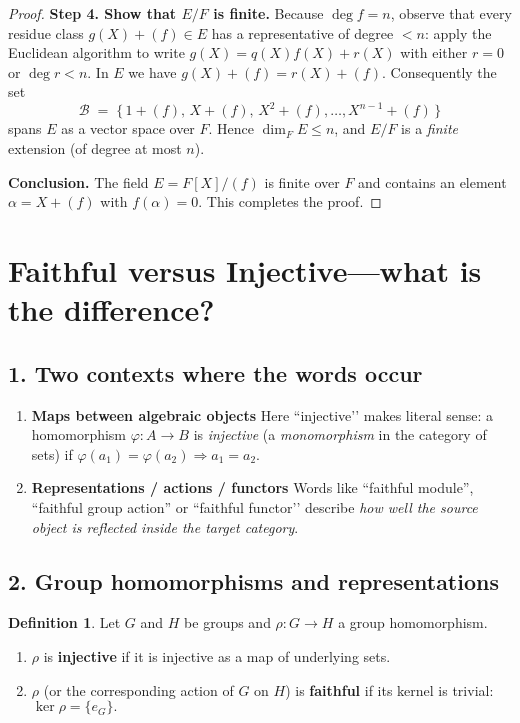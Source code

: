 \documentclass[12pt]{article}
\theoremstyle{definition} %
\newtheorem{definition}{Definition}
\theoremstyle{plain} %
\begin{document}
\begin{proof}
  \textbf{Step 4.  Show that \(E/F\) is finite.}  
  Because \(\deg f = n\), observe that every residue class
  \(g(X)+(f)\in E\) has a representative of degree \(<n\):
  apply the Euclidean algorithm to write \(g(X)=q(X)f(X)+r(X)\) with
  either \(r=0\) or \(\deg r < n\).  In \(E\) we have
  \(g(X)+(f)=r(X)+(f)\).  Consequently the set
  \[
     \mathcal{B}\;=\;\bigl\{\,1+(f),\,X+(f),\,
            X^{2}+(f),\ldots,X^{n-1}+(f)\,\bigr\}
  \]
  spans \(E\) as a vector space over \(F\).  Hence
  \(\dim_{F}E\le n\), and \(E/F\) is a \emph{finite} extension
  (of degree at most \(n\)).
  
  \textbf{Conclusion.}  
  The field \(E=F[X]/(f)\) is finite over \(F\) and contains an element
  \(\alpha=X+(f)\) with \(f(\alpha)=0\).  This completes the proof.
  \end{proof}
  \pagebreak
  \section*{Faithful versus Injective---what is the difference?}

\subsection*{1.  Two contexts where the words occur}

\begin{enumerate}
   \item \textbf{Maps between algebraic objects}  
         Here “injective’’ makes literal sense: a homomorphism 
         \( \varphi\colon A \to B \) is \emph{injective} 
         (a \emph{monomorphism} in the category of sets)  
         if \( \varphi(a_1)=\varphi(a_2)\Rightarrow a_1=a_2\).

   \item \textbf{Representations / actions / functors}  
         Words like “faithful module”, “faithful group action” or
         “faithful functor’’ describe \emph{how well the source object
         is reflected inside the target category}.  
\end{enumerate}

\subsection*{2.  Group homomorphisms and representations}

\begin{definition}
   Let \(G\) and \(H\) be groups and \( \rho\colon G \to H\) a group
   homomorphism.
   \begin{enumerate}
      \item \(\rho\) is \textbf{injective} if it is injective as a map
            of underlying sets.
      \item \(\rho\) (or the corresponding action of \(G\) on \(H\))
            is \textbf{faithful} if its kernel is trivial:
            \(
               \ker\rho=\{e_G\}.
            \)
   \end{enumerate}
\end{definition}
\end{document}
